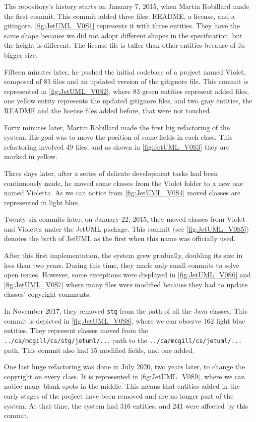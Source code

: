 The repository's history starts on January 7, 2015, when Martin Robillard made the first commit. 
This commit added three files: README, a license, and a gitingore. 
\autoref{fig:JetUML_V0S1} represents it with three entities. They have the same shape because we did not adopt different shapes in the specification, but the height is different. The license file is taller than other entities because of its bigger size. 

Fifteen minutes later, he pushed the initial codebase of a project named Violet, composed of 83 files and an updated version of the gitignore file. This commit is represented in \autoref{fig:JetUML_V0S2}, where 83 green entities represent added files, one yellow entity represents the updated gitignore files, and two gray entities, the README and the license files added before, that were not touched.

Forty minutes later, Martin Robillard made the first big refactoring of the system. His goal was to move the position of some fields in each class. This refactoring involved 49 files, and as shown in \autoref{fig:JetUML_V0S3} they are marked in yellow. 

Three days later, after a series of delicate development tasks had been continuously made, he moved some classes from the Violet folder to a new one named Violetta. As we can notice from \autoref{fig:JetUML_V0S4} moved classes are represented in light blue. 

Twenty-six commits later, on January 22, 2015, they moved classes from Violet and Violetta under the JetUML package. 
This commit (see \autoref{fig:JetUML_V0S5}) denotes the birth of JetUML as the first when this name was officially used.

After this first implementation, the system grew gradually, doubling its size in less than two years. 
During this time, they made only small commits to solve open issues. However, some exceptions were displayed in \autoref{fig:JetUML_V0S6} and \autoref{fig:JetUML_V0S7} where many files were modified because they had to update classes' copyright comments. 

In November 2017, they removed \texttt{stg} from the path of all the Java classes. This commit is depicted in \autoref{fig:JetUML_V0S8}, where we can observe 162 light blue entities. They represent classes moved from the \texttt{../ca/mcgill/cs/stg/jetuml/...} path to the 
\texttt{../ca/mcgill/cs/jetuml/...} path. This commit also had 15 modified fields, and one added. 

One last huge refactoring was done in July 2020, two years later, to change the copyright on every class. It is represented in \autoref{fig:JetUML_V0S9}, where we can notice many blank spots in the middle. This means that entities added in the early stages of the project have been removed and are no longer part of the system. At that time, the system had 316 entities, and 241 were affected by this commit. 

